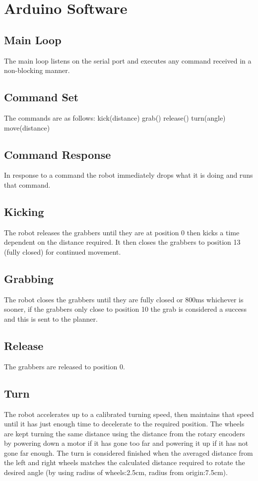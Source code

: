 \documentclass[a4paper]{article}
\begin{document}
\section{Arduino Software}
\subsection{Main Loop}
The main loop listens on the serial port and executes any command received in a non-blocking manner. 
\subsection{Command Set}
The commands are as follows:
kick(distance)
grab()
release()
turn(angle)
move(distance)
\subsection{Command Response}
In response to a command the robot immediately drops what it is doing and runs that command. 
\subsection{Kicking}
The robot releases the grabbers until they are at position 0 then kicks a time dependent on the distance required. It then closes the grabbers to position 13 (fully closed) for continued movement.
\subsection{Grabbing}
The robot closes the grabbers until they are fully closed or 800ms whichever is sooner, if the grabbers only close to position 10 the grab is considered a success and this is sent to the planner. 
\subsection{Release}
The grabbers are released to position 0.
\subsection{Turn}
The robot accelerates up to a calibrated turning speed, then maintains that speed until it has just enough time to decelerate to the required position. The wheels are kept turning the same distance using the distance from the rotary encoders by powering down a motor if it has gone too far and powering it up if it has not gone far enough. The turn is considered finished when the averaged distance from the left and right wheels matches the calculated distance required to rotate the desired angle (by using radius of wheels:2.5cm, radius from origin:7.5cm). 
\end{document}
